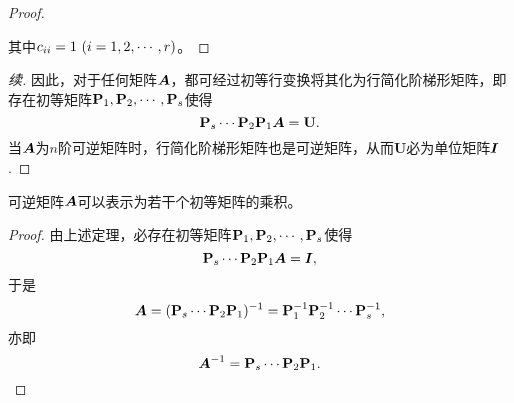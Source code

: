 \begin{frame}
\begin{small}
\begin{proof}
\begin{figure}
        \end{figure}  
        其中$c_{ii}=1~(i=1,2,\cdots,r)$。
\end{proof}
\end{small}
\end{frame}
        
\begin{frame}\ft{\secname}
\begin{small}
\begin{proof}[续]
                        
        因此，对于任何矩阵$\boldsymbol{A}$，都可经过初等行变换将其化为行简化阶梯形矩阵，即存在初等矩阵$\mathbf{P}_1,\mathbf{P}_2,\cdots,\mathbf{P}_s$使得
        $$
        \mathbf{P}_s \cdots \mathbf{P}_2 \mathbf{P}_1 \boldsymbol{A} = \mathbf{U}.
        $$
        \pause
        当$\boldsymbol{A}$为$n$阶可逆矩阵时，行简化阶梯形矩阵也是可逆矩阵，从而$\mathbf{U}$必为单位矩阵$\boldsymbol{I}$.
 \end{proof}
\end{small}

\end{frame}


\begin{frame}\ft{\secname}
\begin{tuilun}
  可逆矩阵$\boldsymbol{A}$可以表示为若干个初等矩阵的乘积。
\end{tuilun}
\pause
\begin{proof}
由上述定理，必存在初等矩阵$\mathbf{P}_1,\mathbf{P}_2,\cdots,\mathbf{P}_s$使得
$$
\mathbf{P}_s \cdots \mathbf{P}_2 \mathbf{P}_1 \boldsymbol{A} = \boldsymbol{I},
$$\pause
于是
$$
\boldsymbol{A} = (\mathbf{P}_s \cdots \mathbf{P}_2 \mathbf{P}_1)^{-1} = \mathbf{P}_1^{-1}\mathbf{P}_2^{-1}\cdots\mathbf{P}_s^{-1},
$$
亦即
$$
\boldsymbol{A}^{-1}=\mathbf{P}_s \cdots \mathbf{P}_2 \mathbf{P}_1.
$$
\end{proof}
\end{frame}


